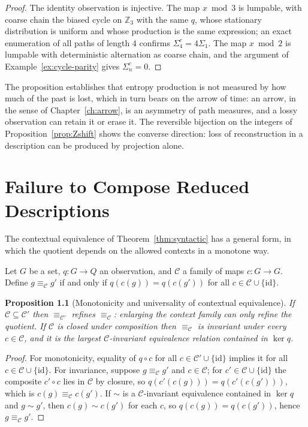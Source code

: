 \documentclass[11pt,oneside]{book}
\newtheorem{proposition}[theorem]{Proposition}
\theoremstyle{definition}
\theoremstyle{remark}
\begin{document}
\begin{proof}
The identity observation is injective. The map $x\bmod3$ is lumpable, with coarse chain the biased cycle on $\mathbb Z_3$ with the same $q$, whose stationary distribution is uniform and whose production is the same expression; an exact enumeration of all paths of length $4$ confirms $\Sigma_4^c=4\Sigma_1$. The map $x\bmod2$ is lumpable with deterministic alternation as coarse chain, and the argument of Example~\ref{ex:cycle-parity} gives $\Sigma_n^c=0$.
\end{proof}

The proposition establishes that entropy production is not measured by how much of the past is lost, which in turn bears on the arrow of time: an arrow, in the sense of Chapter~\ref{ch:arrow}, is an asymmetry of path measures, and a lossy observation can retain it or erase it. The reversible bijection on the integers of Proposition~\ref{prop:Zshift} shows the converse direction: loss of reconstruction in a description can be produced by projection alone.

\chapter{Failure to Compose Reduced Descriptions}\label{ch:compose-fail}

The contextual equivalence of Theorem~\ref{thm:syntactic} has a general form, in which the quotient depends on the allowed contexts in a monotone way.

Let $G$ be a set, $q\colon G\to Q$ an observation, and $\mathcal C$ a family of maps $c\colon G\to G$. Define $g\equiv_{\mathcal C}g'$ if and only if $q(c(g))=q(c(g'))$ for all $c\in\mathcal C\cup\{\mathrm{id}\}$.

\begin{proposition}[Monotonicity and universality of contextual equivalence]\label{prop:context-monotone}
If $\mathcal C\subseteq\mathcal C'$ then $\equiv_{\mathcal C'}$ refines $\equiv_{\mathcal C}$: enlarging the context family can only refine the quotient. If $\mathcal C$ is closed under composition then $\equiv_{\mathcal C}$ is invariant under every $c\in\mathcal C$, and it is the largest $\mathcal C$-invariant equivalence relation contained in $\ker q$.
\end{proposition}

\begin{proof}
For monotonicity, equality of $q\circ c$ for all $c\in\mathcal C'\cup\{\mathrm{id}\}$ implies it for all $c\in\mathcal C\cup\{\mathrm{id}\}$. For invariance, suppose $g\equiv_{\mathcal C}g'$ and $c\in\mathcal C$; for $c'\in\mathcal C\cup\{\mathrm{id}\}$ the composite $c'\circ c$ lies in $\mathcal C$ by closure, so $q(c'(c(g)))=q(c'(c(g')))$, which is $c(g)\equiv_{\mathcal C}c(g')$. If $\sim$ is a $\mathcal C$-invariant equivalence contained in $\ker q$ and $g\sim g'$, then $c(g)\sim c(g')$ for each $c$, so $q(c(g))=q(c(g'))$, hence $g\equiv_{\mathcal C}g'$.
\end{proof}
\end{document}
